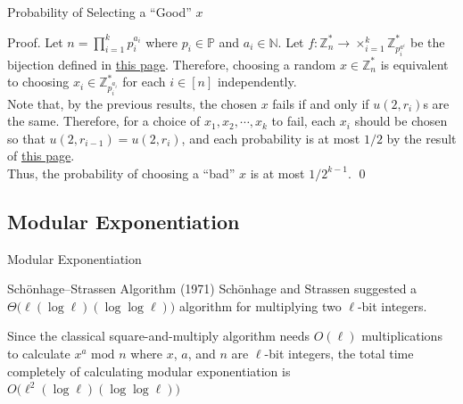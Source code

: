 \documentclass{beamer}
\newcommand{\mbb}[1]{\mathbb{#1}}
\renewcommand{\:}{\text{ }}
\renewcommand{\mod}{\text{ mod }}
\begin{document}
    \begin{frame}{Probability of Selecting a ``Good'' $x$}
        \begin{exampleblock}{Proof.}
            \small
            Let $n = \prod_{i=1}^k p_i^{a_i}$ where $p_i \in \mbb{P}$ and $a_i \in \mbb{N}$.
            Let $f \colon \mbb{Z}_n^\ast \to \times_{i=1}^k \mbb{Z}_{p_i^{a^i}}^\ast$ be the bijection defined in \hyperlink{isomorphism}{\color{blue}this page}.
            Therefore, choosing a random $x \in \mbb{Z}_n^\ast$ is equivalent to choosing $x_i \in \mbb{Z}_{p_i^{a_i}}^\ast$ for each $i \in [n]$ independently. \\[.4em]
            Note that, by the previous results, the chosen $x$ fails if and only if $u(2, r_i)$s are the same. 
            Therefore, for a choice of $x_1, x_2, \cdots, x_k$ to fail, each $x_i$ should be chosen so that $u(2, r_{i-1})=u(2, r_i)$,
            and each probability is at most $1/2$ by the result of \hyperlink{probX}{\color{blue}this page}. \\[.4em]
            Thus, the probability of choosing a ``bad'' $x$ is at most $1/2^{k-1}$. \qed
        \end{exampleblock}
    \end{frame}

    \subsection{Modular Exponentiation}
    \begin{frame}{Modular Exponentiation}
        \begin{block}{Schönhage–Strassen Algorithm (1971) \href{https://en.wikipedia.org/wiki/Schönhage–Strassen_algorithm}{}}
            Schönhage and Strassen suggested a $\Theta \big( \ell (\log \ell) (\log \log \ell) \big)$ algorithm for multiplying two $\ell$-bit integers.
        \end{block}
        \begin{alertblock}{}
            Since the classical square-and-multiply algorithm needs $O(\ell)$ multiplications
            to calculate $x^a \mod n$ where $x$, $a$, and $n$ are $\ell$-bit integers,
            the total time completely of calculating modular exponentiation is $O \big( \ell^2 (\log \ell) (\log \log \ell) \big)$
        \end{alertblock}
    \end{frame}
\end{document}
